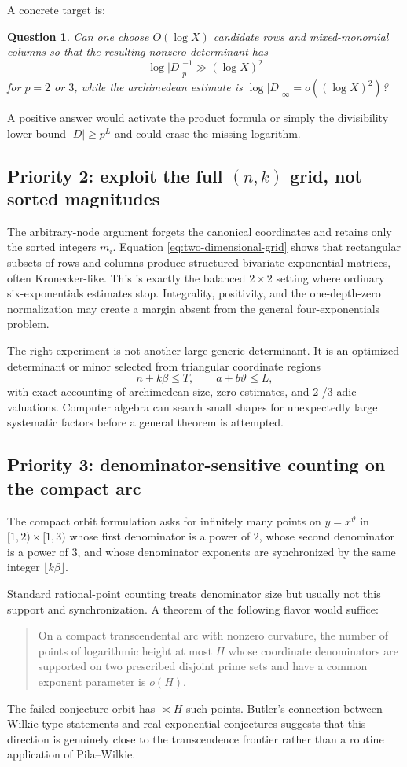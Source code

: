 \documentclass[11pt,oneside]{article}
\newtheorem{question}[theorem]{Question}
\theoremstyle{definition}
\theoremstyle{remark}
\newcommand{\thetaq}{\vartheta}
\begin{document}
A concrete target is:
\begin{question}
Can one choose $O(\!\log X)$ candidate rows and mixed-monomial columns so that the resulting
nonzero determinant has
\[
 \log|D|_p^{-1}\gg(\log X)^2
\]
for $p=2$ or $3$, while the archimedean estimate is
$\log|D|_\infty=o((\log X)^2)$?
\end{question}
A positive answer would activate the product formula or simply the divisibility lower bound
$|D|\ge p^L$ and could erase the missing logarithm.

\subsection{Priority 2: exploit the full $(n,k)$ grid, not sorted magnitudes}

The arbitrary-node argument forgets the canonical coordinates and retains only the sorted
integers $m_i$.  Equation \eqref{eq:two-dimensional-grid} shows that rectangular subsets of
rows and columns produce structured bivariate exponential matrices, often Kronecker-like.
This is exactly the balanced $2\times2$ setting where ordinary six-exponentials estimates stop.
Integrality, positivity, and the one-depth-zero normalization may create a margin absent from
the general four-exponentials problem.

The right experiment is not another large generic determinant.  It is an optimized determinant
or minor selected from triangular coordinate regions
\[
 n+k\beta\le T,
 \qquad a+b\thetaq\le L,
\]
with exact accounting of archimedean size, zero estimates, and $2$-/$3$-adic valuations.
Computer algebra can search small shapes for unexpectedly large systematic factors before a
general theorem is attempted.

\subsection{Priority 3: denominator-sensitive counting on the compact arc}

The compact orbit formulation asks for infinitely many points on
$y=x^{\thetaq}$ in $[1,2)\times[1,3)$ whose first denominator is a power of $2$, whose second
denominator is a power of $3$, and whose denominator exponents are synchronized by the same
integer $\lfloor k\beta\rfloor$.

Standard rational-point counting treats denominator size but usually not this support and
synchronization.  A theorem of the following flavor would suffice:
\begin{quote}
On a compact transcendental arc with nonzero curvature, the number of points of logarithmic
height at most $H$ whose coordinate denominators are supported on two prescribed disjoint
prime sets and have a common exponent parameter is $o(H)$.
\end{quote}
The failed-conjecture orbit has $\asymp H$ such points.  Butler's connection between Wilkie-type
statements and real exponential conjectures suggests that this direction is genuinely close
to the transcendence frontier rather than a routine application of Pila--Wilkie.
\end{document}
